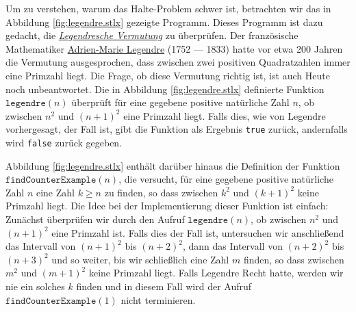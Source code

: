 Um zu verstehen, warum das Halte-Problem schwer ist, betrachten wir  
das in Abbildung \ref{fig:legendre.stlx} gezeigte Programm. 
Dieses Programm ist dazu gedacht, die
\href{http://de.wikipedia.org/wiki/Legendresche_Vermutung}{\emph{Legendresche Vermutung}} zu
überprüfen.  Der französische 
Mathematiker  \href{http://de.wikipedia.org/wiki/Adrien-Marie_Legendre}{Adrien-Marie Legendre} 
(1752 --- 1833) hatte vor etwa 200 Jahren die Vermutung 
ausgesprochen, dass zwischen zwei positiven Quadratzahlen immer eine Primzahl liegt.  Die Frage, ob diese
Vermutung richtig ist, ist auch Heute noch unbeantwortet.  Die in Abbildung \ref{fig:legendre.stlx}
definierte Funktion $\texttt{legendre}(n)$ überprüft für eine gegebene positive natürliche Zahl $n$,
ob zwischen $n^2$ und $(n+1)^2$ eine Primzahl liegt.  Falls dies, wie von Legendre vorhergesagt, der
Fall ist, gibt die Funktion als Ergebnis \texttt{true} zurück, andernfalls wird \texttt{false}
zurück gegeben.

Abbildung \ref{fig:legendre.stlx} enthält darüber hinaus die Definition der Funktion
$\texttt{findCounterExample}(n)$, die versucht, für eine gegebene positive natürliche Zahl $n$ eine
Zahl $k \geq n$ zu finden, so dass zwischen $k^2$ und $(k+1)^2$ keine Primzahl liegt.  Die Idee bei
der Implementierung dieser Funktion ist einfach:  Zunächst überprüfen wir durch den Aufruf
$\texttt{legendre}(n)$, ob zwischen $n^2$ und $(n+1)^2$
eine Primzahl ist.  Falls dies der Fall ist, untersuchen wir anschließend das Intervall von
$(n+1)^2$ bis $(n+2)^2$, dann das Intervall von 
$(n+2)^2$ bis $(n+3)^2$ und so weiter, bis wir schließlich eine Zahl $m$ finden, so dass zwischen
$m^2$ und $(m+1)^2$ keine Primzahl liegt.  Falls Legendre Recht hatte, werden wir nie ein solches
$k$ finden und in diesem Fall wird der Aufruf $\texttt{findCounterExample}(1)$ nicht terminieren. 

